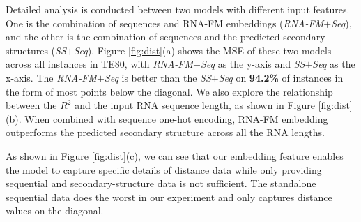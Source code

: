 

Detailed analysis is conducted between two models with different input features. One is the combination of sequences and RNA-FM embeddings (\textit{RNA-FM$+$Seq}), and the other is the combination of sequences and the predicted secondary structures (\textit{SS$+$Seq}). Figure \ref{fig:dist}(a) shows the MSE of these two models across all instances in TE80, with \textit{RNA-FM$+$Seq} as the y-axis and \textit{SS$+$Seq} as the x-axis. The \textit{RNA-FM$+$Seq} is better than the \textit{SS$+$Seq} on \textbf{94.2\%} of instances in the form of most points below the diagonal. We also explore the relationship between the $R^2$ and the input RNA sequence length, as shown in Figure \ref{fig:dist}(b). When combined with sequence one-hot encoding, RNA-FM embedding outperforms the predicted secondary structure across all the RNA lengths.

As shown in Figure \ref{fig:dist}(c), we can see that our embedding feature enables the model to capture specific details of distance data while only providing sequential and secondary-structure data is not sufficient. The standalone sequential data does the worst in our experiment and only captures distance values on the diagonal.





